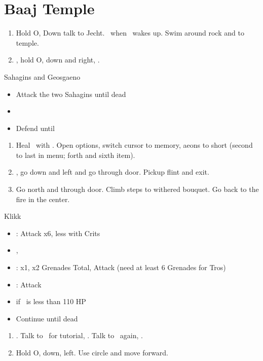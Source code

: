 \chapter{Baaj Temple}\label{ch:baaj-temple}

\begin{enumerate}
	\item Hold O, Down talk to Jecht. \sd \ when \tidus \ wakes up. Swim around rock and to temple.
	\item \cs, hold O, down and right, \cs.
\end{enumerate}
\begin{battle}{Sahagins and Geosgaeno}
	\begin{itemize}
		\item Attack the two Sahagins until dead
		\item \cs[0:30]
		\item Defend until \cs
	\end{itemize}
\end{battle}
\begin{enumerate}[resume]
	\item Heal \tidus \ with \potion. Open options, switch cursor to memory, aeons to short (second to last in menu; forth and sixth item).
	\item \cs, go down and left and go through door. Pickup flint and exit.
	\item Go north and through door. Climb steps to withered bouquet. Go back to the fire in the center. \cs[2:10]
\end{enumerate}
\begin{battle}[1500]{Klikk}
	\begin{itemize}
		\item \tidus: Attack x6, less with Crits
		\item \cs, \sd
		\item \rikku: \grenade x1, \steal x2 Grenades Total, Attack (need at least 6 Grenades for Tros)
		\item \tidus: Attack
		\item \potion if \tidus \ is less than 110 HP
		\item Continue until dead
	\end{itemize}
\end{battle}
\begin{enumerate}[resume]
	\item \cs[2:30]. Talk to \rikku \ for tutorial, \sd. Talk to \rikku \ again, \sd.
	\item Hold O, down, left. Use circle and move forward.
\end{enumerate}

